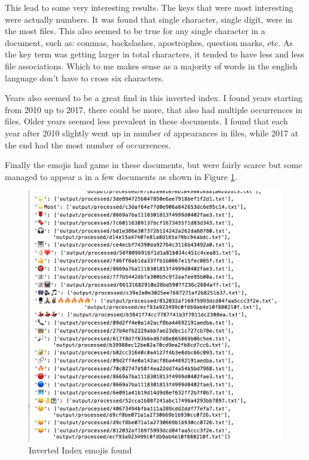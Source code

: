\documentclass[letterpaper,11pt]{article}
\newcommand*{\srcPath}{../src}%
\begin{document}
This lead to some very interesting results. The keys that were most interesting were actually numbers. It was found that single character, single digit, were in the most files. This also seemed to be true for any single character in a document, such as: commas, backslashes, apostrophes, question marks, etc. As the key term was getting larger in total characters, it tended to have less and less file associations. Which to me makes sense as a majority of words in the english language don't have to cross six characters.

Years also seemed to be a great find in this inverted index. I found years starting from 2010 up to 2017, there could be more, that also had multiple occurrences in files. Older years seemed less prevalent in these documents. I found that each year after 2010 slightly went up in number of appearances in files, while 2017 at the end had the most number of occurrences.

Finally the emojis had game in these documents, but were fairly scarce but some managed to appear a in a few documents as shown in Figure \ref{fig:q7emojis}.



\begin{figure}[h]
\centering
\includegraphics[scale=0.65]{emojiIndex.png}
\caption{Inverted Index emojis found}
\label{fig:q7emojis}
\end{figure}
\end{document}
